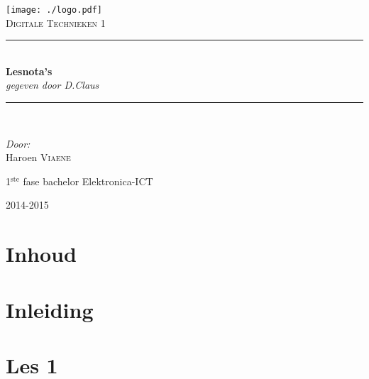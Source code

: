 \documentclass[11pt, a4paper]{article}
\newcommand{\HRule}{\rule{\linewidth}{0.5mm}}
\begin{document}
\begin{titlepage}
\begin{center}
\texttt{[image: ./logo.pdf]}~\\[1cm]


\textsc{\Large Digitale Technieken 1}\\[0.5cm]

\HRule \\[0.4cm]
{ \LARGE \bfseries Lesnota's}\\[0.4cm]
{\large \textit{gegeven door D.Claus}}\\[0.2cm]

\HRule \\[1.5cm]

\begin{minipage}{0.4\textwidth}
\begin{flushleft} \large
\emph{Door: }\\
Haroen \textsc{Viaene}\\

\end{flushleft}
\end{minipage}
\begin{minipage}{0.4\textwidth}
\begin{flushright} \large
\large{1$^{\text{ste}}$ fase bachelor Elektronica-ICT}\\
\end{flushright}
\end{minipage}

\vfill

{\large 2014-2015}

\end{center}
\end{titlepage}

\newpage

\section*{Inhoud}

\tableofcontents

\newpage

\section{Inleiding}

\section{Les 1}
\end{document}
